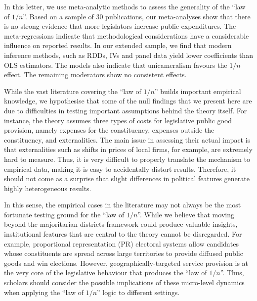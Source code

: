 \documentclass[11pt,a4paper,]{article}
\begin{document}
\label{sec:discussion}

In this letter, we use meta-analytic methods to assess the generality of
the ``law of \(1/n\)''. Based on a sample of 30 publications, our
meta-analyses show that there is no strong evidence that more
legislators increase public expenditures. The meta-regressions indicate
that methodological considerations have a considerable influence on
reported results. In our extended sample, we find that modern inference
methods, such as RDDs, IVs and panel data yield lower coefficients than
OLS estimators. The models also indicate that unicameralism favours the
\(1/n\) effect. The remaining moderators show no consistent effects.

While the vast literature covering the ``law of \(1/n\)'' builds
important empirical knowledge, we hypothesise that some of the null
findings that we present here are due to difficulties in testing
important assumptions behind the theory itself. For instance, the theory
assumes three types of costs for legislative public good provision,
namely expenses for the constituency, expenses outside the constituency,
and externalities. The main issue in assessing their actual impact is
that externalities such as shifts in prices of local firms, for example,
are extremely hard to measure. Thus, it is very difficult to properly
translate the mechanism to empirical data, making it is easy to
accidentally distort results. Therefore, it should not come as a
surprise that slight differences in political features generate highly
heterogeneous results.

In this sense, the empirical cases in the literature may not always be
the most fortunate testing ground for the ``law of \(1/n\)''. While we
believe that moving beyond the majoritarian districts framework could
produce valuable insights, institutional features that are central to
the theory cannot be disregarded. For example, proportional
representation (PR) electoral systems allow candidates whose
constituents are spread across large territories to provide diffused
public goods and win elections. However, geographically-targeted service
provision is at the very core of the legislative behaviour that produces
the ``law of \(1/n\)''. Thus, scholars should consider the possible
implications of these micro-level dynamics when applying the ``law of
\(1/n\)'' logic to different settings.
\end{document}
